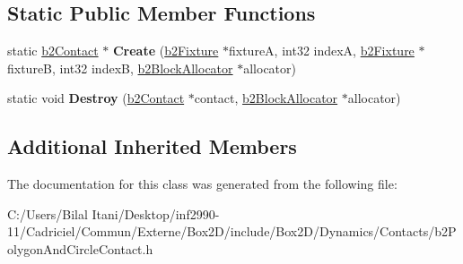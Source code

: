 \subsection*{Static Public Member Functions}
\begin{DoxyCompactItemize}
\item 
static \hyperlink{classb2_contact}{b2\+Contact} $\ast$ {\bfseries Create} (\hyperlink{classb2_fixture}{b2\+Fixture} $\ast$fixtureA, int32 indexA, \hyperlink{classb2_fixture}{b2\+Fixture} $\ast$fixtureB, int32 indexB, \hyperlink{classb2_block_allocator}{b2\+Block\+Allocator} $\ast$allocator)\hypertarget{classb2_polygon_and_circle_contact_a0ff5b8e7167146b5716bce55365b7fc3}{}\label{classb2_polygon_and_circle_contact_a0ff5b8e7167146b5716bce55365b7fc3}

\item 
static void {\bfseries Destroy} (\hyperlink{classb2_contact}{b2\+Contact} $\ast$contact, \hyperlink{classb2_block_allocator}{b2\+Block\+Allocator} $\ast$allocator)\hypertarget{classb2_polygon_and_circle_contact_a666779f20aa3b57cfc0c60e3ac235f6b}{}\label{classb2_polygon_and_circle_contact_a666779f20aa3b57cfc0c60e3ac235f6b}

\end{DoxyCompactItemize}
\subsection*{Additional Inherited Members}


The documentation for this class was generated from the following file\+:\begin{DoxyCompactItemize}
\item 
C\+:/\+Users/\+Bilal Itani/\+Desktop/inf2990-\/11/\+Cadriciel/\+Commun/\+Externe/\+Box2\+D/include/\+Box2\+D/\+Dynamics/\+Contacts/b2\+Polygon\+And\+Circle\+Contact.\+h\end{DoxyCompactItemize}
